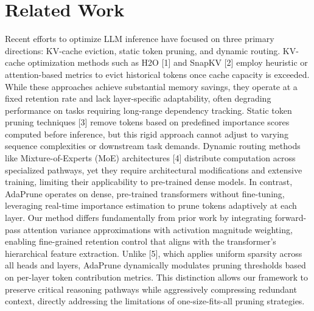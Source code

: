 \documentclass[11pt,a4paper]{article}
\begin{document}
\section{Related Work}
Recent efforts to optimize LLM inference have focused on three primary directions: KV-cache eviction, static token pruning, and dynamic routing. KV-cache optimization methods such as H2O [1] and SnapKV [2] employ heuristic or attention-based metrics to evict historical tokens once cache capacity is exceeded. While these approaches achieve substantial memory savings, they operate at a fixed retention rate and lack layer-specific adaptability, often degrading performance on tasks requiring long-range dependency tracking. Static token pruning techniques [3] remove tokens based on predefined importance scores computed before inference, but this rigid approach cannot adjust to varying sequence complexities or downstream task demands. Dynamic routing methods like Mixture-of-Experts (MoE) architectures [4] distribute computation across specialized pathways, yet they require architectural modifications and extensive training, limiting their applicability to pre-trained dense models. In contrast, AdaPrune operates on dense, pre-trained transformers without fine-tuning, leveraging real-time importance estimation to prune tokens adaptively at each layer. Our method differs fundamentally from prior work by integrating forward-pass attention variance approximations with activation magnitude weighting, enabling fine-grained retention control that aligns with the transformer's hierarchical feature extraction. Unlike [5], which applies uniform sparsity across all heads and layers, AdaPrune dynamically modulates pruning thresholds based on per-layer token contribution metrics. This distinction allows our framework to preserve critical reasoning pathways while aggressively compressing redundant context, directly addressing the limitations of one-size-fits-all pruning strategies.
\end{document}

